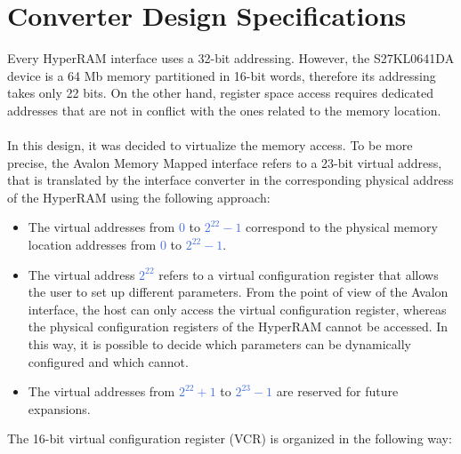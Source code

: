 \documentclass[10pt, english, a4paper, titlepage, oneside]{book}
\begin{document}
\section{Converter Design Specifications} \label{Converter Design Specifications}
\vspace{2mm}
Every HyperRAM interface uses a 32-bit addressing. However, the S27KL0641DA device is a 64 Mb memory partitioned in 16-bit words, therefore its addressing takes only 22 bits. On the other hand, register space access requires dedicated addresses that are not in conflict with the ones related to the memory location. \\ \\
In this design, it was decided to virtualize the memory access. To be more precise, the Avalon Memory Mapped interface refers to a 23-bit virtual address, that is translated by the interface converter in the corresponding physical address of the HyperRAM using the following approach:
\vspace{2mm}
\begin{itemize}
    \item The virtual addresses from \textcolor{RoyalBlue}{0} to \textcolor{RoyalBlue}{$2^{22}-1$} correspond to the physical memory location addresses from \textcolor{RoyalBlue}{0} to \textcolor{RoyalBlue}{$2^{22}-1$}.
    \vspace{1mm}
    \item The virtual address \textcolor{RoyalBlue}{$2^{22}$} refers to a virtual configuration register that allows the user to set up different parameters. From the point of view of the Avalon interface, the host can only access the virtual configuration register, whereas the physical configuration registers of the HyperRAM cannot be accessed. In this way, it is possible to decide which parameters can be dynamically configured and which cannot.
    \vspace{1mm}
    \item The virtual addresses from \textcolor{RoyalBlue}{$2^{22} + 1$} to \textcolor{RoyalBlue}{$2^{23} - 1$} are reserved for future expansions.
\end{itemize}
\vspace{4mm}
The 16-bit virtual configuration register (VCR) is organized in the following way:
\vspace{4mm}
\renewcommand{\arraystretch}{1.5}
\end{document}
